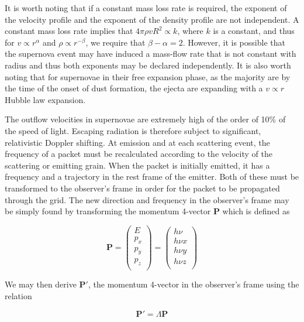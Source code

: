 It is worth noting that if a constant mass loss rate is required, the exponent of the velocity profile and the exponent of the density profile are not independent.  A constant mass loss rate implies that $4\pi \rho vR^2  \propto k$, where $k$ is a constant, and thus for $v \propto r^\alpha$ and $\rho\propto r^{-\beta}$, we require that $\beta-\alpha=2$.  However, it is possible that the supernova event may have induced a mass-flow rate that is not constant with radius and thus both exponents may be declared independently.  It is also worth noting that for supernovae in their free expansion phase, as the majority are by the time of the onset of dust formation, the ejecta are expanding with a $v \propto r$ Hubble law expansion.
	
The outflow velocities in supernovae are extremely high of the order of 10\% of the speed of light.  Escaping radiation is therefore subject to significant, relativistic Doppler shifting. At emission and at each scattering event, the frequency of a packet must be recalculated according to the velocity of the scattering or emitting grain.  When the packet is initially emitted, it has a frequency and a trajectory in the rest frame of the emitter. Both of these must be transformed to the observer's frame in order for the packet to be propagated through the grid.  The new direction and frequency in the observer's frame may be simply found by transforming the momentum 4-vector $\boldsymbol{P}$ which is defined as

\begin{equation}
\boldsymbol{P}=
\begin{pmatrix}
	E \\
	p_x \\
	p_y \\
	p_z \\
	\end{pmatrix} =
	\begin{pmatrix}
	h \nu \\
	h \nu x \\
	h \nu y \\
	h \nu z \\
	\end{pmatrix}
\end{equation}


\noindent We may then derive $\boldsymbol{P'}$, the momentum 4-vector in the observer's frame using the relation

\begin{equation}
	\boldsymbol{P'}=\Lambda \boldsymbol{P}	
\end{equation}

